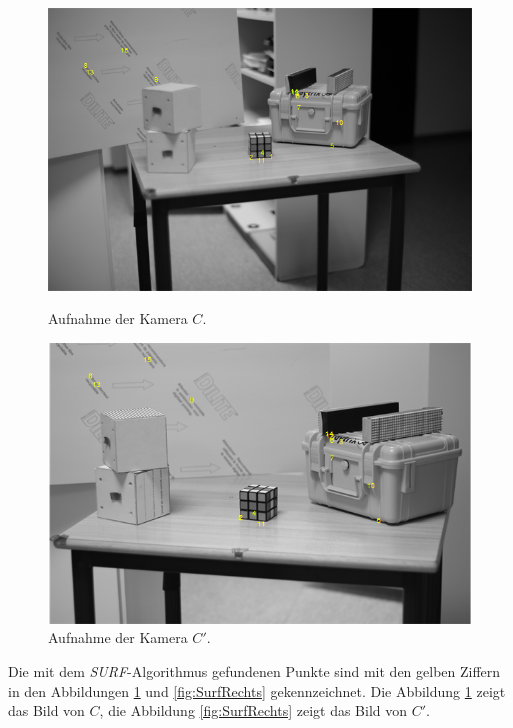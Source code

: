 \begin{figure}[!htb]
	\includegraphics[width=\linewidth]{images/PointsDetectedLeft.png}
	\caption[Aufnahme von Kamera $C$]{Aufnahme der Kamera $C$.}
	\label{fig:SurfRechts}
	\endminipage\hfill
	\includegraphics[width=\linewidth]{images/PointsDetectedRight.png}
	\caption[Aufnahme von Kamera $C'$]{Aufnahme der Kamera $C'$.}
	\label{fig:SurfLinks}
	\endminipage\hfill
\end{figure}

Die mit dem \textit{SURF}-Algorithmus gefundenen Punkte sind mit den gelben Ziffern in den Abbildungen \ref{fig:SurfLinks} und \ref{fig:SurfRechts} gekennzeichnet. Die Abbildung \ref{fig:SurfLinks} zeigt das Bild von $C$, die Abbildung \ref{fig:SurfRechts} zeigt das Bild von $C'$.\\

